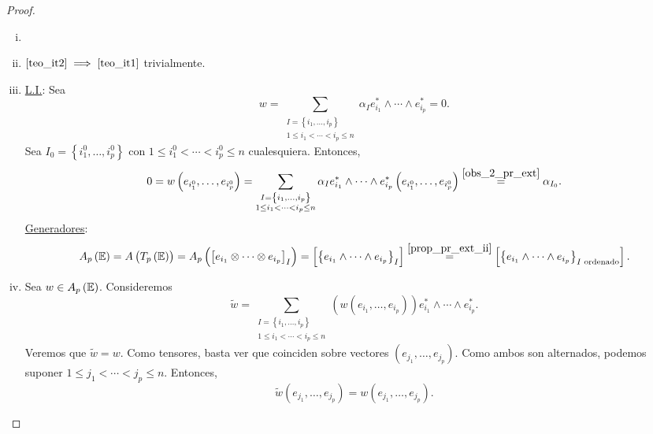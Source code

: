 \begin{proof}
    \begin{enumerate}[i)]
        \item[]
        \item
            $\ref{teo_it2} \implies \ref{teo_it1}$ trivialmente.
        \item
            \underline{L.I.}: Sea
            \[
                w=\sum_{\substack{I=\left\{ i_1, \dots , i_p \right\} \\ 1\leq i_1 < \cdots < i_p \leq n}} \alpha _I e_{i_1}^* \wedge \cdots \wedge e_{i_p}^*=0.
            \]
            Sea $I_0=\left\{ i_1^0, \dots , i_p^0 \right\} $ con $1\leq i_1^0 < \cdots < i_p^0 \leq n$ cualesquiera. Entonces,
            \[
                0=w \left( e_{i_1^0} , \dots , e_{i_p^0} \right)= \sum_{\substack{I=\left\{ i_1, \dots , i_p \right\} \\ 1\leq i_1 < \cdots < i_p \leq n}} \alpha _I e_{i_1}^* \wedge \cdots \wedge e_{i_p}^* \left( e_{i_1^0} , \dots , e_{i_p^0} \right) \stackrel{\ref{obs_2_pr_ext}} = \alpha _ {I_0}.
            \]
            \underline{Generadores}:
            \[
                A_p \left( \mathbb{E} \right) = A \left( T_p \left( \mathbb{E} \right) \right) = A_p \left( \left[ e_{i_1} \otimes \cdots \otimes e_{i_p} \right]_I \right) = \left[ \left\{ e_{i_1} \wedge \cdots \wedge e_{i_p} \right\}_I \right] \stackrel{\ref{prop_pr_ext_ii}}= \left[ \left\{ e_{i_1} \wedge \cdots \wedge e_{i_p} \right\}_{I\text{ ordenado}} \right].
            \]
        \item
            Sea $w \in A_p\left(\mathbb{E}\right)$. Consideremos
            \[
                \tilde{w}=\sum_{\substack{I=\left\{ i_1, \dots , i_p \right\} \\ 1\leq i_1 < \cdots < i_p \leq n}} \left( w \left( e_{i_1} , \dots , e_{i_p} \right) \right) e_{i_1}^* \wedge \cdots \wedge e_{i_p}^*.
            \]
            Veremos que $\tilde{w}=w$. Como tensores, basta ver que coinciden sobre vectores $\left( e_{j_1}, \dots , e_{j_p} \right)$. Como ambos son alternados, podemos suponer $1 \leq j_1  < \cdots < j_p \leq n$. Entonces,
            \[
                \tilde{w} \left( e_{j_1}, \dots , e_{j_p} \right) = w \left( e_{j_1}, \dots , e_{j_p} \right).
            \]

    \end{enumerate}
\end{proof}

